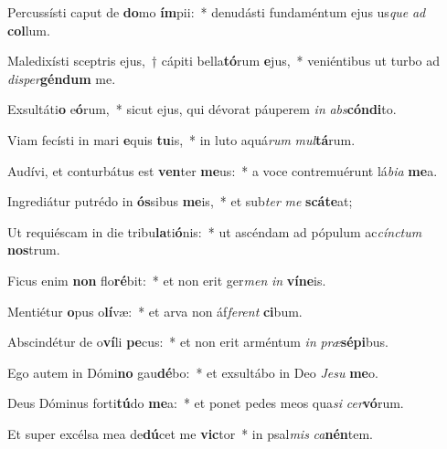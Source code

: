 \item Percussísti caput de \textbf{do}mo \textbf{ím}pii:~* denudásti fundaméntum ejus us\textit{que} \textit{ad} \textbf{col}lum.
\item Maledixísti sceptris ejus,~† cápiti bella\textbf{tó}rum \textbf{e}jus,~* veniéntibus ut turbo ad \textit{di}\textit{sper}\textbf{gén}\textbf{dum} me.
\item Exsultáti\textbf{o} e\textbf{ó}rum,~* sicut ejus, qui dévorat páuperem \textit{in} \textit{abs}\textbf{cón}\textbf{di}to.
\item Viam fecísti in mari \textbf{e}quis \textbf{tu}is,~* in luto aquá\textit{rum} \textit{mul}\textbf{tá}rum.
\item Audívi, et conturbátus est \textbf{ven}ter \textbf{me}us:~* a voce contremuérunt lá\textit{bi}\textit{a} \textbf{me}a.
\item Ingrediátur putrédo in \textbf{ós}sibus \textbf{me}is,~* et sub\textit{ter} \textit{me} \textbf{scá}\textbf{te}at;
\item Ut requiéscam in die tribu\textbf{la}ti\textbf{ó}nis:~* ut ascéndam ad pópulum ac\textit{cínc}\textit{tum} \textbf{nos}trum.
\item Ficus enim \textbf{non} flo\textbf{ré}bit:~* et non erit ger\textit{men} \textit{in} \textbf{ví}\textbf{ne}is.
\item Mentiétur \textbf{o}pus o\textbf{lí}væ:~* et arva non áf\textit{fe}\textit{rent} \textbf{ci}bum.
\item Abscindétur de o\textbf{ví}li \textbf{pe}cus:~* et non erit arméntum \textit{in} \textit{præ}\textbf{sé}\textbf{pi}bus.
\item Ego autem in Dómi\textbf{no} gau\textbf{dé}bo:~* et exsultábo in Deo \textit{Je}\textit{su} \textbf{me}o.
\item Deus Dóminus forti\textbf{tú}do \textbf{me}a:~* et ponet pedes meos qua\textit{si} \textit{cer}\textbf{vó}rum.
\item Et super excélsa mea de\textbf{dú}cet me \textbf{vic}tor~* in psal\textit{mis} \textit{ca}\textbf{nén}tem.
